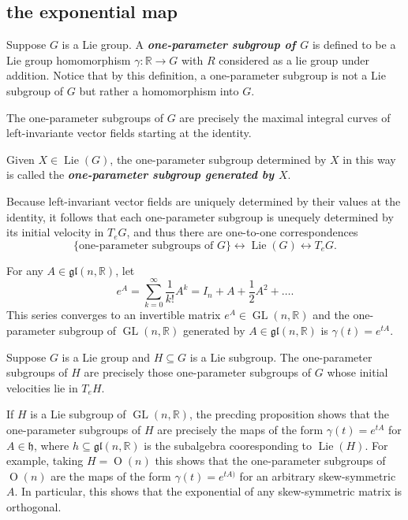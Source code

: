 \subsection{the exponential map}
\begin{defn}
	Suppose $G$ is a Lie group. A \textbf{\textit{one-parameter subgroup of $G$}} is defined to be a Lie group homomorphism $\gamma:\mathbb{R}\to G$ with $R$ considered as a lie group under addition. Notice that by this definition, a one-parameter subgroup is not a Lie subgroup of $G$ but rather a homomorphism into $G$.
\end{defn}
\begin{thm}
	The one-parameter subgroups of $G$ are precisely the maximal integral curves of left-invariante vector fields starting at the identity.
\end{thm}
\begin{defn}
	Given $X\in\operatorname{Lie}(G)$, the one-parameter subgroup determined by $X$ in this way is called the \textbf{\textit{one-parameter subgroup generated by $X$}}.
\end{defn}
Because left-invariant vector fields are uniquely determined by their values at the identity, it follows that each one-parameter subgroup is unequely determined by its initial velocity in $T_eG$, and thus there are one-to-one correspondences
\[\{\text{one-parameter subgroups of }G\}\leftrightarrow\operatorname{Lie}(G)\leftrightarrow T_eG.\]
\begin{prop}
	For any $A\in\mathfrak{gl}(n,\mathbb{R})$, let
	\[e^A=\sum_{k=0}^\infty\frac{1}{k!}A^k=I_n+A+\frac{1}{2}A^2+\ldots.\]
	This series converges to an invertible matrix $e^A\in\operatorname{GL}(n,\mathbb{R})$ and the one-parameter subgroup of $\operatorname{GL}(n,\mathbb{R})$ generated by $A\in\mathfrak{gl}(n,\mathbb{R})$ is $\gamma(t)=e^{tA}$.
\end{prop}
\begin{prop}
	Suppose $G$ is a Lie group and $H\subseteq G$ is a Lie subgroup. The one-parameter subgroups of $H$ are precisely those one-parameter subgroups of $G$ whose initial velocities lie in $T_eH$.
\end{prop}
\begin{example}
	If $H$ is a Lie subgroup of $\operatorname{GL}(n,\mathbb{R})$, the precding proposition shows that the one-parameter subgroups of $H$ are precisely the maps of the form $\gamma(t)=e^{tA}$ for $A\in\mathfrak{h}$, where $h\subseteq\mathfrak{gl}(n,\mathbb{R})$ is the subalgebra cooresponding to $\operatorname{Lie}(H)$. For example, taking $H=\operatorname{O}(n)$ this shows that the one-parameter subgroups of $\operatorname{O}(n)$ are the maps of the form $\gamma(t)=e^{tA)}$ for an arbitrary skew-symmetric $A$. In particular, this shows that the exponential of any skew-symmetric matrix is orthogonal.
\end{example}
